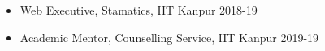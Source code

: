 
{\fontsize{11pt}{1em}\bodyfontlight\upshape\color{text}
  \begin{itemize}
  \item Web Executive, Stamatics, IIT Kanpur 2018-19
  \item Academic Mentor, Counselling Service, IIT Kanpur 2019-19
  \end{itemize}
}